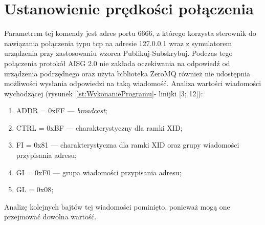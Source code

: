     \section{Ustanowienie prędkości połączenia}
    Parametrem tej komendy jest adres portu 6666, z którego korzysta sterownik do nawiązania połączenia typu tcp na adresie 127.0.0.1 wraz z symulatorem urządzenia
    przy zastosowaniu wzorca Publikuj-Subskrybuj. Podczas tego połączenia protokół AISG 2.0 nie zakłada oczekiwania na odpowiedź od urządzenia podrzędnego oraz użyta biblioteka
    ZeroMQ również nie udostępnia możliwości wysłania odpowiedzi na taką wiadomość.
    \newline
	Analiza wartości wiadomości wychodzącej (rysunek \ref{lst:WykonanieProgramu}- linijki [3; 12]):
	\begin{enumerate}
        \item ADDR = 0xFF --- \textit{broadcast};
        \item CTRL = 0xBF --- charakterystyczny dla ramki XID;
        \item FI = 0x81 --- charakterystyczna dla ramki XID oraz grupy wiadomości przypisania adresu;
        \item GI = 0xF0 --- grupa wiadomości przypisania adresu;
        \item GL = 0x08;
    \end{enumerate}
    Analizę kolejnych bajtów tej wiadomości pominięto, ponieważ mogą one przejmować dowolna wartość. 
